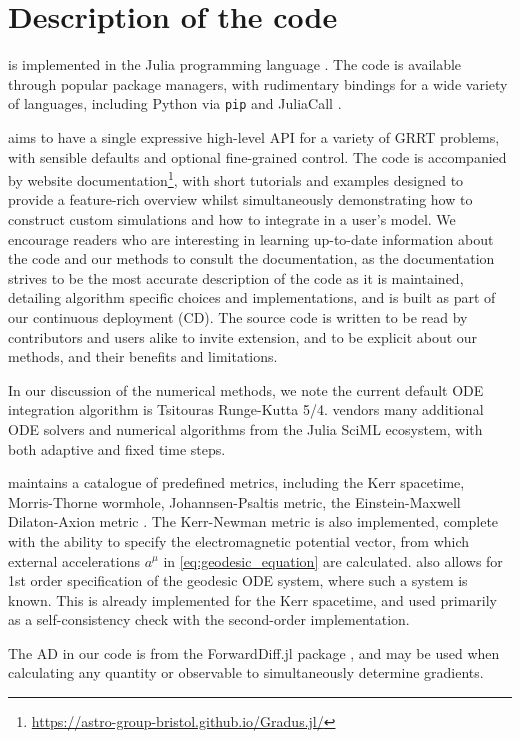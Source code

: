 \section{Description of the code}

\Gradus is implemented in the Julia programming language \citep{Bezanson_Julia_A_fresh_2017}. The code is available through popular package managers, with rudimentary bindings for a wide variety of languages, including Python via \texttt{pip} and JuliaCall \citep{}.

\Gradus aims to have a single expressive high-level API for a variety of GRRT problems, with sensible defaults and optional fine-grained control. The code is accompanied by website documentation\footnote{\url{https://astro-group-bristol.github.io/Gradus.jl/}}, with short tutorials and examples designed to provide a feature-rich overview whilst simultaneously demonstrating how to construct custom simulations and how to integrate \Gradus in a user's model. We encourage readers who are interesting in learning up-to-date information about the code and our methods to consult the documentation, as the documentation strives to be the most accurate description of the code as it is maintained, detailing algorithm specific choices and implementations, and is built as part of our continuous deployment (CD). The source code is written to be read by contributors and users alike to invite extension, and to be explicit about our methods, and their benefits and limitations.

In our discussion of the numerical methods, we note the current default ODE integration algorithm is Tsitouras Runge-Kutta 5/4. \Gradus vendors many additional ODE solvers and numerical algorithms from the Julia SciML ecosystem, with both adaptive and fixed time steps.

\Gradus maintains a catalogue of predefined metrics, including the Kerr spacetime, Morris-Thorne wormhole, Johannsen-Psaltis metric, the Einstein-Maxwell Dilaton-Axion metric . The Kerr-Newman metric is also implemented, complete with the ability to specify the electromagnetic potential vector, from which external accelerations $a^\mu$ in \eqref{eq:geodesic_equation} are calculated. \Gradus also allows for 1st order specification of the geodesic ODE system, where such a system is known. This is already implemented for the Kerr spacetime, and used primarily as a self-consistency check with the second-order implementation.

The AD in our code is from the ForwardDiff.jl package \citep{RevelsLubinPapamarkou2016}, and may be used when calculating any quantity or observable to simultaneously determine gradients.

